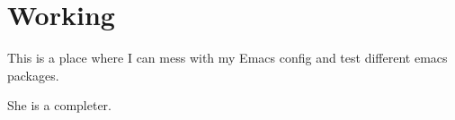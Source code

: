 \documentclass[12pt]{article}
\begin{document}
\section*{Working}

This is a place where I can mess with my Emacs config and test different emacs packages.

She is a completer. 
\end{document}
